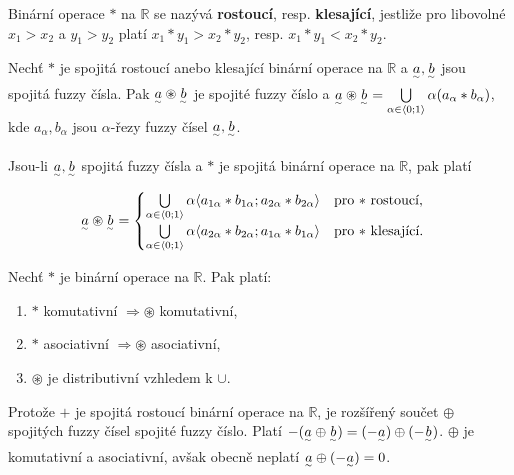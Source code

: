 {\begin{definition}
Binární operace $\ast$ na $\mathbb{R}$ se nazývá \textbf{rostoucí}, resp. \textbf{klesající}, jestliže pro libovolné $x_1 > x_2$ a $y_1 > y_2$ platí $x_1 \ast y_1 > x_2 \ast y_2$, resp. $x_1 \ast y_1 < x_2 \ast y_2$.
\end{definition}

\begin{theorem}
Nechť $\ast$ je spojitá rostoucí anebo klesající binární operace na $\mathbb{R}$ a $\underset{^\sim}a, \underset{^\sim}b$ jsou spojitá fuzzy čísla. Pak $\underset{^\sim}a \circledast \underset{^\sim}b$ je spojité fuzzy číslo a $\underset{^\sim}a \circledast \underset{^\sim}b = \bigcup\limits_{\alpha \in \langle 0; 1 \rangle} \alpha (a_{\alpha} \ast b_{\alpha})$, kde $a_{\alpha}, b_{\alpha}$ jsou $\alpha$-řezy fuzzy čísel $\underset{^\sim}a, \underset{^\sim}b$.
\end{theorem}

\begin{dusledek}
Jsou-li $\underset{^\sim}a, \underset{^\sim}b$ spojitá fuzzy čísla a $\ast$ je spojitá binární operace na $\mathbb{R}$, pak platí
\begin{equation*}
\underset{^\sim}a \circledast \underset{^\sim}b =
\begin{cases}
\bigcup\limits_{\alpha \in \langle 0; 1 \rangle} \alpha \langle a_{1\alpha} \ast b_{1\alpha}; a_{2\alpha} \ast b_{2\alpha} \rangle \quad \text{pro $\ast$ rostoucí,}\\
\bigcup\limits_{\alpha \in \langle 0; 1 \rangle} \alpha \langle a_{2\alpha} \ast b_{2\alpha}; a_{1\alpha} \ast b_{1\alpha} \rangle \quad \text{pro $\ast$ klesající.}
\end{cases}
\end{equation*}
\end{dusledek}

\begin{theorem}
Nechť $\ast$ je binární operace na $\mathbb{R}$. Pak platí:
\begin{enumerate}
\item $\ast$ komutativní $\Rightarrow \circledast$ komutativní,
\item $\ast$ asociativní $\Rightarrow \circledast$ asociativní,
\item $\circledast$ je distributivní vzhledem k $\cup$.
\end{enumerate}
\end{theorem}

\begin{dusledek}
Protože $+$ je spojitá rostoucí binární operace na $\mathbb{R}$, je rozšířený součet $\oplus$ spojitých fuzzy čísel spojité fuzzy číslo. Platí $-(\underset{^\sim}a \oplus \underset{^\sim}b) = (-\underset{^\sim}a) \oplus (-\underset{^\sim}b)$. $\oplus$ je komutativní a asociativní, avšak obecně neplatí $\underset{^\sim}a \oplus (-\underset{^\sim}a) = 0$.
\end{dusledek}

}
